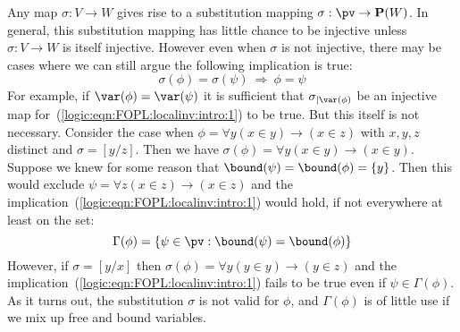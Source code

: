 Any map $\sigma:V\to W$ gives rise to a substitution mapping
$\sigma:\pv\to{\bf P}(W)$. In general, this substitution mapping has
little chance to be injective unless $\sigma:V\to W$ is itself
injective. However even when $\sigma$ is not injective, there may be
cases where we can still argue the following implication is true:
    \begin{equation}\label{logic:eqn:FOPL:localinv:intro:1}
    \sigma(\phi)=\sigma(\psi)\ \Rightarrow\ \phi=\psi
    \end{equation}
For example, if $\var(\phi)=\var(\psi)$ it is sufficient that
$\sigma_{|\var(\phi)}$ be an injective map
for~(\ref{logic:eqn:FOPL:localinv:intro:1}) to be true. But this
itself is not necessary. Consider the case when $\phi=\forall y(x\in
y)\to(x\in z)$ with $x,y,z$ distinct and $\sigma=[y/z]$. Then we
have $\sigma(\phi)=\forall y(x\in y)\to(x\in y)$. Suppose we knew
for some reason that $\bound(\psi)=\bound(\phi)=\{y\}$. Then this
would exclude $\psi=\forall z(x\in z)\to(x\in z)$ and the
implication~(\ref{logic:eqn:FOPL:localinv:intro:1}) would hold, if
not everywhere at least on the set:
    \[
    \Gamma(\phi)=\{\psi\in\pv:\bound(\psi)=\bound(\phi)\}
    \]
However, if $\sigma=[y/x]$ then $\sigma(\phi)=\forall y(y\in
y)\to(y\in z)$ and the
implication~(\ref{logic:eqn:FOPL:localinv:intro:1}) fails to be true
even if $\psi\in\Gamma(\phi)$. As it turns out, the substitution
$\sigma$ is not valid for $\phi$, and $\Gamma(\phi)$ is of little
use if we mix up free and bound variables.

